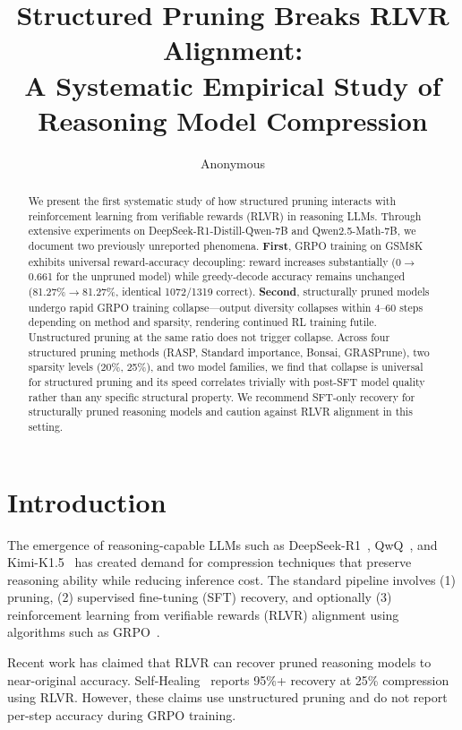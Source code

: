 \documentclass[11pt,a4paper]{article}
\title{Structured Pruning Breaks RLVR Alignment:\\A Systematic Empirical Study of Reasoning Model Compression}
\author{Anonymous}
\begin{document}
\maketitle

\begin{abstract}
We present the first systematic study of how structured pruning interacts with reinforcement learning from verifiable rewards (RLVR) in reasoning LLMs. Through extensive experiments on DeepSeek-R1-Distill-Qwen-7B and Qwen2.5-Math-7B, we document two previously unreported phenomena. \textbf{First}, GRPO training on GSM8K exhibits universal reward-accuracy decoupling: reward increases substantially (0$\to$0.661 for the unpruned model) while greedy-decode accuracy remains unchanged (81.27\%$\to$81.27\%, identical 1072/1319 correct). \textbf{Second}, structurally pruned models undergo rapid GRPO training collapse---output diversity collapses within 4--60 steps depending on method and sparsity, rendering continued RL training futile. Unstructured pruning at the same ratio does not trigger collapse. Across four structured pruning methods (RASP, Standard importance, Bonsai, GRASPrune), two sparsity levels (20\%, 25\%), and two model families, we find that collapse is universal for structured pruning and its speed correlates trivially with post-SFT model quality rather than any specific structural property. We recommend SFT-only recovery for structurally pruned reasoning models and caution against RLVR alignment in this setting.
\end{abstract}

\section{Introduction}
\label{sec:intro}

The emergence of reasoning-capable LLMs such as DeepSeek-R1~\cite{deepseek2025r1}, QwQ~\cite{qwq2024}, and Kimi-K1.5~\cite{kimi2025} has created demand for compression techniques that preserve reasoning ability while reducing inference cost. The standard pipeline involves (1) pruning, (2) supervised fine-tuning (SFT) recovery, and optionally (3) reinforcement learning from verifiable rewards (RLVR) alignment using algorithms such as GRPO~\cite{shao2024deepseekmath}.

Recent work has claimed that RLVR can recover pruned reasoning models to near-original accuracy. Self-Healing~\cite{selfhealing2025} reports 95\%+ recovery at 25\% compression using RLVR. However, these claims use unstructured pruning and do not report per-step accuracy during GRPO training.
\end{document}
